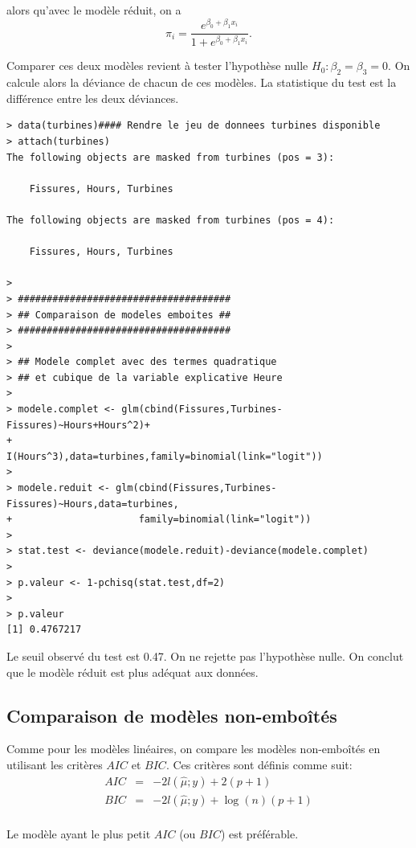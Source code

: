 \documentclass[11pt]{article}
\begin{document}
\noindent alors qu'avec le modèle réduit, on a 
$$\pi_i = \frac{e^{\beta_0+\beta_1 x_i}}{1+e^{\beta_0+\beta_1 x_i}}.$$

\noindent Comparer ces deux modèles revient \`a tester l'hypothèse nulle $H_0: \beta_2=\beta_3=0$. On calcule alors la déviance de chacun de ces modèles. La statistique du test est la différence entre les deux déviances.

\begin{verbatim}
> data(turbines)#### Rendre le jeu de donnees turbines disponible
> attach(turbines)
The following objects are masked from turbines (pos = 3):

    Fissures, Hours, Turbines

The following objects are masked from turbines (pos = 4):

    Fissures, Hours, Turbines

> 
> #####################################
> ## Comparaison de modeles emboites ##
> #####################################
> 
> ## Modele complet avec des termes quadratique 
> ## et cubique de la variable explicative Heure
> 
> modele.complet <- glm(cbind(Fissures,Turbines-Fissures)~Hours+Hours^2)+
+                       I(Hours^3),data=turbines,family=binomial(link="logit"))
> 
> modele.reduit <- glm(cbind(Fissures,Turbines-Fissures)~Hours,data=turbines,
+                      family=binomial(link="logit"))
> 
> stat.test <- deviance(modele.reduit)-deviance(modele.complet)
> 
> p.valeur <- 1-pchisq(stat.test,df=2)
> 
> p.valeur
[1] 0.4767217
\end{verbatim}

\noindent Le seuil observé du test est 0.47. On ne rejette pas l'hypothèse nulle. On conclut que le modèle réduit est plus adéquat aux données.

\subsection{Comparaison de modèles non-embo\^ités}

Comme pour les modèles linéaires, on compare les modèles non-embo\^ités en utilisant les critères $AIC$ et $BIC$. Ces critères sont définis comme suit: 
\begin{eqnarray*}
AIC &=& -2 l(\hat\mu;y) + 2 (p+1) \\
BIC &=& -2 l(\hat\mu;y) + \log(n) (p+1) \\
\end{eqnarray*}

\noindent Le modèle ayant le plus petit $AIC$ (ou $BIC$) est préférable.
\end{document}
